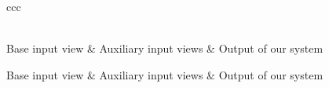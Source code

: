 \newcommand\ColHeadings{Base input view & Auxiliary input views & Output of our system}


\begin{centering}
  \begin{longtable}{ccc}
    \caption{Here we show further examples of scenes inferred by our
      system. In the table below, the left panel shows the base input
      view, the middle panel shows the two auxiliary views used for
      photo--consistency calculations, and the right panel shows the
      MAP scene $\Scene$ inferred by our system.}\\

    \ColHeadings
    \endfirsthead

    \ColHeadings
    \endhead

     \\
    \endfoot
    \endlastfoot


\end{longtable}
\end{centering}
